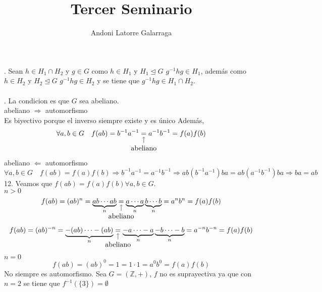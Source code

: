 \documentclass{article}
\title{Tercer Seminario}
\author{Andoni Latorre Galarraga}
\date{}
\newcommand{\bb}[1]{\mathbb{#1}}
\newcommand{\nota}[3][2ex]{
    \underset{\mathclap{
        \begin{tikzpicture}
          \draw[->] (0, 0) to ++(0,#1);
          \node[below] at (0,0) {#3};
        \end{tikzpicture}}}{#2}
}
\begin{document}
\maketitle
{}. Sean $h\in H_1\cap H_2$ y $g\in G$ como $h\in H_1$ y $H_1\trianglelefteq G$ $g^{-1} h g \in H_1$, además como $h\in H_2$ y $H_2\trianglelefteq G$ $g^{-1} h g \in H_2$ y se tiene que $g^{-1} h g \in H_1\cap H_2$.\\\\
. La condicion es que $G$ sea abeliano.\\
abeliano $\Rightarrow$ automorfismo\\
Es biyectivo porque el inverso siempre existe y es único Además,
$$
\forall a,b\in G \quad f(ab)=b^{-1}a^{-1}\nota{=}{\text{abeliano}}a^{-1}b^{-1}=f(a)f(b)
$$
abeliano $\Leftarrow$ automorfismo\\
$$
\forall a,b\in G \quad f(ab)=f(a)f(b) \Rightarrow b^{-1}a^{-1}=a^{-1}b^{-1} \Rightarrow ab(b^{-1}a^{-1})ba=ab(a^{-1}b^{-1})ba \Rightarrow ba=ab
$$
12. Veamos que $f(ab)=f(a)f(b) \forall a,b\in G$.\\
$n>0$
$$
f(ab)=(ab)^n=\underbrace{ab\cdots ab}_n \nota{=}{abeliano}\underbrace{a\cdots a}_n \underbrace{b\cdots b}_n=a^nb^n=f(a)f(b)
$$
$$
f(ab)=(ab)^{-n}=\underbrace{-(ab)\cdots -(ab)}_n \nota{=}{abeliano}\underbrace{-a\cdots -a}_n \underbrace{-b\cdots -b}_n=a^{-n}b^{-n}=f(a)f(b)
$$
$n=0$
$$
f(ab)=(ab)^0=1=1\cdot 1=a^0b^0=f(a)f(b)
$$
No siempre es automorfismo. Sea $G=(\bb{Z},+)$, $f$ no es suprayectiva ya que con $n=2$ se tiene que $f^{-1}(\{3\})=\emptyset$
\end{document}
